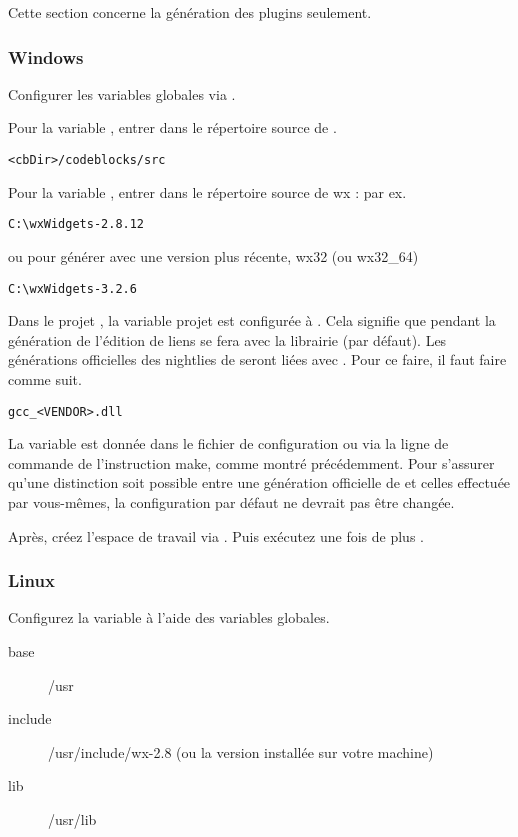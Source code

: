 Cette section concerne la génération des plugins seulement.

\subsubsection{Windows}

Configurer les variables globales via .


Pour la variable , entrer dans  le répertoire source de \codeblocks.

\begin{verbatim}
<cbDir>/codeblocks/src
\end{verbatim}


Pour la variable , entrer dans  le répertoire source de wx : par ex.

\begin{verbatim}
C:\wxWidgets-2.8.12
\end{verbatim}

ou pour générer avec une version plus récente, wx32 (ou wx32\_64)

\begin{verbatim}
C:\wxWidgets-3.2.6
\end{verbatim}

Dans le projet \codeblocks, la variable projet  est configurée à . Cela signifie que pendant la génération de \codeblocks l'édition de liens se fera avec la librairie  (par défaut). Les générations officielles des nightlies de \codeblocks seront liées avec . Pour ce faire, il faut faire comme suit.

\begin{verbatim}
gcc_<VENDOR>.dll
\end{verbatim}

La variable  est donnée dans le fichier de configuration  ou via la ligne de commande de l'instruction make, comme montré précédemment. Pour s'assurer qu'une distinction soit possible entre une génération officielle de \codeblocks et celles effectuée par vous-mêmes, la configuration par défaut  ne devrait pas être changée.

Après, créez l'espace de travail  via . Puis exécutez une fois de plus .

\subsubsection{Linux}

Configurez la variable  à l'aide des variables globales.

\begin{description}
\item[base] /usr
\item[include] /usr/include/wx-2.8 (ou la version installée sur votre machine)
\item[lib] /usr/lib
\end{description}


